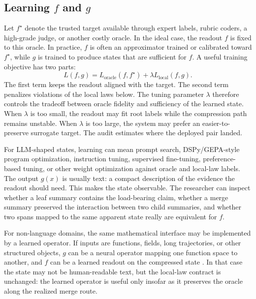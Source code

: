 \subsection{Learning $f$ and $g$}

Let $f^\star$ denote the trusted target available through expert labels,
rubric coders, a high-grade judge, or another costly oracle. In the ideal
case, the readout $f$ is fixed to this oracle. In practice, $f$ is often an
approximator trained or calibrated toward $f^\star$, while $g$ is trained to
produce states that are sufficient for $f$. A useful training objective has
two parts:
\[
  L(f,g)
  =
  L_{\mathrm{oracle}}(f,f^\star)
  +
  \lambda L_{\mathrm{local}}(f,g).
\]
The first term keeps the readout aligned with the target. The second term
penalizes violations of the local laws below. The tuning parameter $\lambda$
therefore controls the tradeoff between oracle fidelity and sufficiency of
the learned state. When $\lambda$ is too small, the readout may fit root labels
while the compression path remains unstable. When $\lambda$ is too large, the
system may prefer an easier-to-preserve surrogate target. The audit estimates
where the deployed pair landed.

For LLM-shaped states, learning can mean prompt search, DSPy/GEPA-style
program optimization, instruction tuning, supervised fine-tuning,
preference-based tuning, or other weight optimization against oracle and
local-law labels. The output $g(x)$ is usually text: a compact description of
the evidence the readout should need. This makes the state observable. The
researcher can inspect whether a leaf summary contains the load-bearing claim,
whether a merge summary preserved the interaction between two child summaries,
and whether two spans mapped to the same apparent state really are equivalent
for $f$.

For non-language domains, the same mathematical interface may be implemented
by a learned operator. If inputs are functions, fields, long trajectories, or
other structured objects, $g$ can be a neural operator mapping one function
space to another, and $f$ can be a learned readout on the compressed state
\citep{Kovachki23NeuralOperator,Li21FNO}. In that case the state may not be
human-readable text, but the local-law contract is unchanged: the learned
operator is useful only insofar as it preserves the oracle along the realized
merge route.

